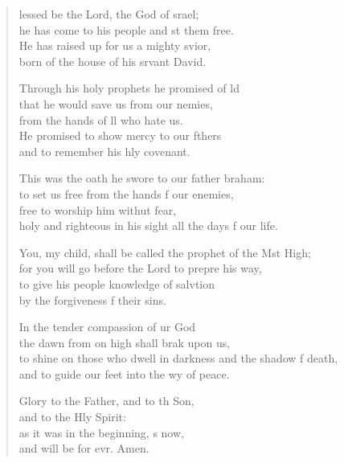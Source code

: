 \settowidth{\versewidth}{to shine on those who dwell in darkness and the shadow of death, *}
\begin{verse}%
  \begin{patverse}
lessed be the Lord, the God of srael;\Med\\
he has come to his people and st them free.\\
He has raised up for us a mighty svior,\Med\\
born of the house of his srvant David.

Through his holy prophets he promised of ld\Flex\\
that he would save us from our nemies,\Med\\
from the hands of ll who hate us.\\
He promised to show mercy to our fthers\Med\\
and to remember his hly covenant.

This was the oath he swore to our father braham:\Med\\
to set us free from the hands f our enemies,\\
free to worship him withut fear,\Med\\
holy and righteous in his sight all the days f our life. 

You, my child, shall be called the prophet of the Mst High;\Med\\
for you will go before the Lord to prepre his way,\\
to give his people knowledge of salvtion\Med\\
by the forgiveness f their sins.

In the tender compassion of ur God\Med\\
the dawn from on high shall brak upon us,\\
to shine on those who dwell in darkness and the shadow f death,\Med\\
and to guide our feet into the wy of peace.

Glory to the Father, and to th Son,\Med\\
and to the Hly Spirit:\\
as it was in the beginning, \pointup{\i}s now,\Med\\
and will be for evr. Amen.
  \end{patverse}
  \end{verse}
